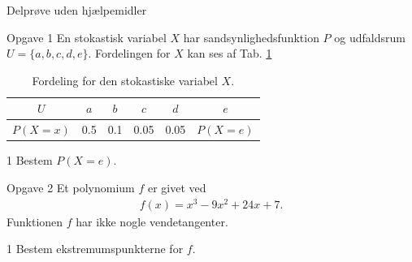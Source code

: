 \begin{center}
\LARGE
Delprøve uden hjælpemidler 
\end{center}
\begin{opgavetekst}{Opgave 1}
	En stokastisk variabel $X$ har sandsynlighedsfunktion $P$ og udfaldsrum  \\
	$U = \{a,b,c,d,e\}$. Fordelingen for $X$ 
	kan ses af Tab. \ref{tab:fordeling}
	\begin{table}[H]
		\centering
		\begin{tabular}{c|c|c|c|c|c}
			$U$ & $a$ & $b$ &  $c$ & $d$ & $e$ \\
			\hline
			$P(X=x)$ & 0.5 & 0.1 & 0.05 & 0.05 & $P(X=e)$
		\end{tabular}
		\caption{Fordeling for den stokastiske variabel $X$. }
		\label{tab:fordeling}		
	\end{table}
	\phantom{h}
\end{opgavetekst}
	\begin{delopgave}{}{1}
		Bestem $P(X=e)$.
	\end{delopgave}

\begin{opgavetekst}{Opgave 2}
	Et polynomium $f$ er givet ved
	\begin{align*}
		f(x) = x^3-9x^2+24x+7.
	\end{align*}
	Funktionen $f$ har ikke nogle vendetangenter.
\end{opgavetekst}
\begin{delopgave}{}{1}
	Bestem ekstremumspunkterne for $f$. 
\end{delopgave}

